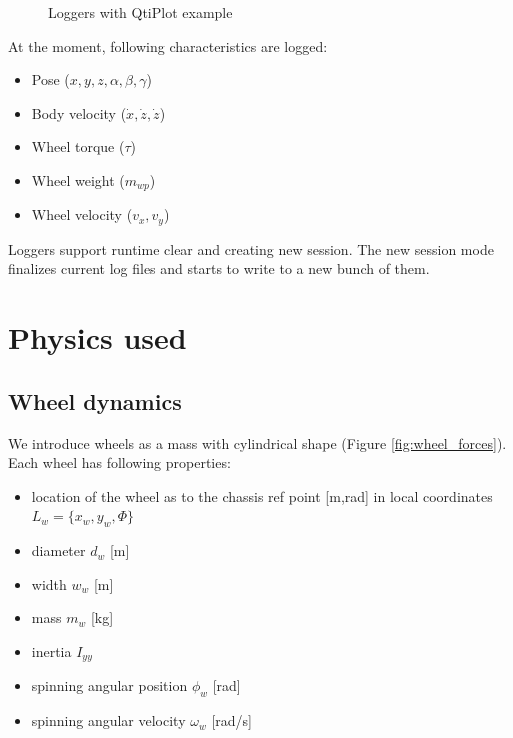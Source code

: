 \documentclass[a4paper,11pt]{article}
\begin{document}
\begin{figure}[h!]%
	\centering
	\qquad
	\caption{Loggers with QtiPlot example}%
	\label{fig:qtiplot_example1}%
\end{figure}


At the moment, following characteristics are logged: 
\begin{itemize}
	\item Pose ($x, y, z, \alpha, \beta, \gamma$)
	\item Body velocity ($\dot{x}, \dot{z}, \dot{z}$)
	\item Wheel torque ($\tau$)
	\item Wheel weight ($m_{wp}$)
	\item Wheel velocity ($v_x, v_y$)
\end{itemize}

Loggers support runtime clear and creating new session. The new session mode finalizes current log files and starts to write to a new bunch of them.


\newpage

\section{Physics used}
\subsection{Wheel dynamics}

We introduce wheels as a mass with cylindrical shape (Figure \ref{fig:wheel_forces}).
Each wheel has following properties:
\begin{itemize}
\item location of the wheel as to the chassis ref point [m,rad] in local coordinates $L_w = \{ x_w, y_w, \Phi \}$
\item diameter $d_w$ [m]
\item width $w_w$ [m]
\item mass $m_w$ [kg]
\item inertia $I_{yy}$ 
\item spinning angular position $\phi_w$ [rad]
\item spinning angular velocity $\omega_w$ [rad/s]
\end{itemize}
\end{document}
